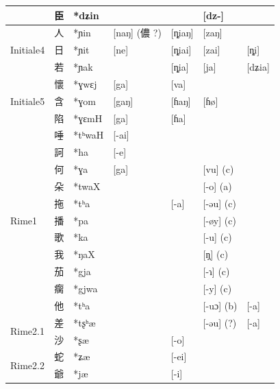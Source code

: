 \documentclass{scrbook}
\newcounter{c}[subsubsection]
\begin{document}
\begin{sloppypar}
\begin{landscape}
\begin{longtable}[htbp]{lllllll}
          & 臣     & *dʑin &       &       & [dz-] &  \\
    \midrule
    \multirow{3}[2]{*}{Initiale4} & 人     & *ɲin  & \multicolumn{1}{l}{[naŋ] (儂 ?)} & [ȵiaŋ] & [zaŋ] &  \\
          & 日     & *ɲit  & \multicolumn{1}{l}{[ne]} & [ȵiai] & [zai] & \multicolumn{1}{l}{[ȵi]} \\
          & 若     & *ɲak  &       & [ȵia] & [ja]  & \multicolumn{1}{l}{[dʑia]} \\
    \midrule
    \multirow{3}[2]{*}{Initiale5} & 懷     & *ɣwɛj & \multicolumn{1}{l}{[ga]} & [va]  &       &  \\
          & 含     & *ɣom  & \multicolumn{1}{l}{[gaŋ]} & [ɦaŋ] & [ɦø]  &  \\
          & 陷     & *ɣɛmH & \multicolumn{1}{l}{[ga]} & [ɦa]  &       &  \\
    \midrule
    \multirow{11}[2]{*}{Rime1} & 唾     & *tʰwaH & \multicolumn{1}{l}{[-ai]} &       &       &  \\
          & 訶     & *ha   & \multicolumn{1}{l}{[-e]} &       &       &  \\
          & 何     & *ɣa   & \multicolumn{1}{l}{[ga]}      &  & [vu] (c) &  \\
          & 朵     & *twaX &       &       & [-o] (a) &  \\
          & 拖     & *tʰa  &       & \multicolumn{1}{l}{[-a]} & [-əu] (c) &  \\
          & 播     & *pa   &       &       & [-øy] (c) &  \\
          & 歌     & *ka   &       &       & [-u] (c) &  \\
          & 我     & *ŋaX  &       &       & [ŋ̩] (c) &  \\
          & 茄     & *gja  &       &       & [-ɿ] (c) &  \\
          & 瘸     & *gjwa &       &       & [-y] (c) &  \\
          & 他     & *tʰa  &       &       & [-uɔ] (b) & [-a]\\
    \midrule
    \multirow{2}[2]{*}{Rime2.1} & 差     & *tʂʰæ &       &       & [-əu] (?) & \multicolumn{1}{l}{[-a]} \\
          & 沙     & *ʂæ   &       & [-o]  &       &  \\
    \midrule
    \multirow{3}[2]{*}{Rime2.2} & 蛇     & *ʑæ   &       & [-ei] &       &  \\
          & 爺     & *jæ   &       & [-i]  &       &  \\

\end{longtable}
\end{landscape}
\end{sloppypar}
\end{document}
